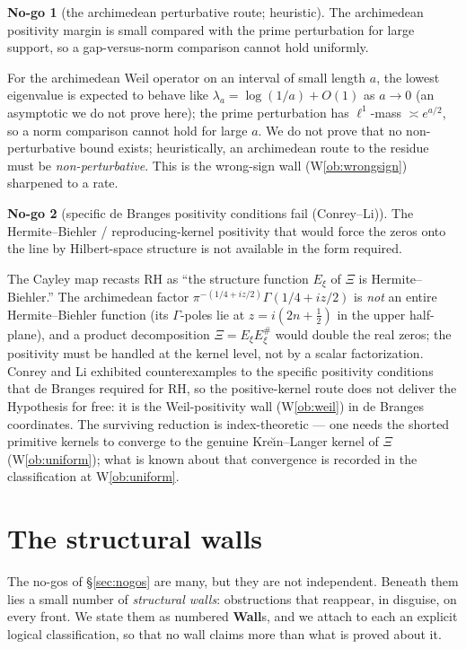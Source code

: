 \documentclass[11pt]{amsart}
\theoremstyle{definition}
\theoremstyle{remark}
\theoremstyle{definition}
\newtheorem{nogo}{No-go}[section]
\begin{document}
\begin{nogo}[the archimedean perturbative route; heuristic]\label{ng:perturbative}
The archimedean positivity margin is small compared with the prime perturbation for large support, so a
gap-versus-norm comparison cannot hold uniformly.
\end{nogo}
\noindent For the archimedean Weil operator on an interval of small length $a$, the lowest eigenvalue is
expected to behave like $\lambda_a=\log(1/a)+O(1)$ as $a\to0$ (an asymptotic we do not prove here); the
prime perturbation has $\ell^1$-mass $\asymp e^{a/2}$, so a norm comparison cannot hold for large $a$. We
do not prove that no non-perturbative bound exists; heuristically, an archimedean route to the residue
must be \emph{non-perturbative}. This is the wrong-sign
wall (W\ref{ob:wrongsign}) sharpened to a rate.

\begin{nogo}[specific de Branges positivity conditions fail (Conrey--Li)]\label{ng:debranges}
The Hermite--Biehler / reproducing-kernel positivity that would force the zeros onto the line by
Hilbert-space structure is not available in the form required.
\end{nogo}
\noindent The Cayley map recasts RH as ``the structure function $E_\xi$ of $\Xi$ is Hermite--Biehler.''
The archimedean factor $\pi^{-(1/4+iz/2)}\Gamma(1/4+iz/2)$ is \emph{not} an entire Hermite--Biehler
function (its $\Gamma$-poles lie at $z=i(2n+\tfrac12)$ in the upper half-plane), and a product
decomposition $\Xi=E_\xi E_\xi^\#$ would double the real zeros; the positivity must be handled at the
kernel level, not by a scalar factorization. Conrey and Li \cite{ConreyLi} exhibited counterexamples to
the specific positivity conditions that de Branges required for RH, so the positive-kernel route does not
deliver the Hypothesis for free: it is the Weil-positivity wall (W\ref{ob:weil}) in de Branges
coordinates. The surviving reduction is index-theoretic --- one needs the shorted primitive kernels to
converge to the genuine Kre\u{\i}n--Langer kernel of $\Xi$ (W\ref{ob:uniform}); what is known about that
convergence is recorded in the classification at W\ref{ob:uniform}.

\section{The structural walls}\label{sec:walls}

The no-gos of \S\ref{sec:nogos} are many, but they are not independent. Beneath them lies a small number of
\emph{structural walls}: obstructions that reappear, in disguise, on every front. We state them as numbered
\textbf{Wall}s, and we attach to each an explicit logical classification, so
that no wall claims more than what is proved about it.
\end{document}
